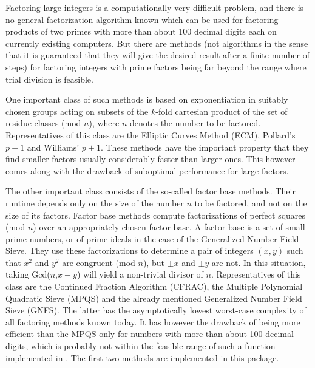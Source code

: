 

Factoring large integers is a computationally very difficult problem,
and there is no general factorization algorithm known which can be used
for factoring products of two primes with more than about 100 decimal
digits each on currently existing computers. But there are methods
(not algorithms in the sense that it is guaranteed that they will give
the desired result after a finite number of steps) for factoring integers
with prime factors being far beyond the range where trial division is
feasible.

One important class of such methods is based on exponentiation in
suitably chosen groups acting on subsets of the $k$-fold cartesian
product of the set of residue classes (mod $n$), where $n$ denotes the
number to be factored.
Representatives of this class are the Elliptic Curves Method (ECM),
Pollard's $p-1$ and Williams' $p+1$.
These methods have the important property that they find smaller
factors usually considerably faster than larger ones.
This however comes along with the drawback of suboptimal performance
for large factors.

The other important class consists of the so-called factor base methods.
Their runtime depends only on the size of the number $n$ to be factored,
and not on the size of its factors.
Factor base methods compute factorizations of perfect squares (mod $n$)
over an appropriately chosen factor base.
A factor base is a set of small prime numbers, or of
prime ideals in the case of the
Generalized Number Field Sieve.
They use these factorizations to determine a pair of integers $(x,y)$
such that $x^2$ and $y^2$ are congruent (mod $n$), but $\pm x$ and
$\pm y$ are not. In this situation, taking Gcd($n$,$x-y$) will yield
a non-trivial divisor of $n$.
Representatives of this class are the Continued Fraction Algorithm
(CFRAC), the Multiple Polynomial Quadratic Sieve (MPQS) and the
already mentioned Generalized Number Field Sieve (GNFS). The latter has
the asymptotically lowest worst-case complexity of all factoring methods
known today. It has however the drawback of being more efficient
than the MPQS only for numbers with more than about 100 decimal digits,
which is probably not within the feasible range of such a function
implemented in {\GAP}.
The first two methods are implemented in this package.

